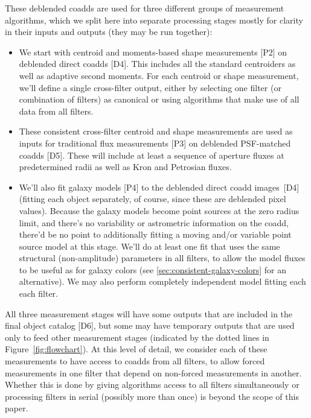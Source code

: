 \documentclass[10pt]{article}
\begin{document}
These deblended coadds are used for three different groups of measurement
algorithms, which we split here into separate processing stages mostly for
clarity in their inputs and outputs (they may be run together):
\begin{itemize}
\item We start with centroid and moments-based shape measurements [P2] on
    deblended direct coadds [D4].  This includes all the standard centroiders
    as well as adaptive second moments.  For each centroid or shape
    measurement, we'll define a single cross-filter output, either by
    selecting one filter (or combination of filters) as canonical or using
    algorithms that make use of all data from all filters.
\item These consistent cross-filter centroid and shape measurements are used
    as inputs for traditional flux measurements [P3] on deblended PSF-matched
    coadds [D5].  These will include at least a sequence of aperture fluxes at
    predetermined radii as well as Kron and Petrosian fluxes.
\item We'll also fit galaxy models [P4] to the deblended direct coadd
    images~[D4] (fitting each object separately, of course, since these are
    deblended pixel values).  Because the galaxy models become point sources
    at the zero radius limit, and there's no variability or astrometric
    information on the coadd, there'd be no point to additionally fitting a
    moving and/or variable point source model at this stage.  We'll do at
    least one fit that uses the same structural (non-amplitude) parameters
    in all filters, to allow the model fluxes to be useful as for galaxy
    colors (see \ref{sec:consistent-galaxy-colors} for an alternative).  We
    may also perform completely independent model fitting each each filter.
\end{itemize}

All three measurement stages will have some outputs that are included in the
final object catalog [D6], but some may have temporary outputs that are used
only to feed other measurement stages (indicated by the dotted lines in
Figure~\ref{fig:flowchart}).  At this level of detail, we consider each of
these measurements to have access to coadds from all filters, to allow forced
measurements in one filter that depend on non-forced measurements in another.
Whether this is done by giving algorithms access to all filters simultaneously
or processing filters in serial (possibly more than once) is beyond the scope
of this paper.
\end{document}
